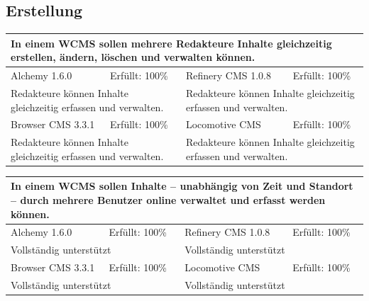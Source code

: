 \subsection{Erstellung}
\begin{tabular}[!ht]{|l|l|l|l|}
\hline
\multicolumn{4}{|p{15cm}|}{\textbf{In einem WCMS sollen mehrere Redakteure Inhalte gleichzeitig erstellen, ändern, löschen und verwalten können.}} \\
\hline
  Alchemy 1.6.0 & \cellcolor{green}Erfüllt: 100\% & Refinery CMS 1.0.8 & \cellcolor{green}Erfüllt: 100\% \\
  \hline
  \multicolumn{2}{|p{7.5cm}|}{Redakteure können Inhalte gleichzeitig erfassen und verwalten.}
   & \multicolumn{2}{p{7.5cm}|}{Redakteure können Inhalte gleichzeitig erfassen und verwalten.} \\
  \hline
  Browser CMS 3.3.1 & \cellcolor{green}Erfüllt: 100\% & Locomotive CMS & \cellcolor{green}Erfüllt: 100\% \\
  \hline
  \multicolumn{2}{|p{7.5cm}|}{Redakteure können Inhalte gleichzeitig erfassen und verwalten.} & \multicolumn{2}{p{7.5cm}|}{Redakteure können Inhalte gleichzeitig erfassen und verwalten.} \\
\hline
\end{tabular}
\newline
\newline
\newline
\begin{tabular}[!ht]{|l|l|l|l|}
\hline
\multicolumn{4}{|p{15cm}|}{\textbf{In einem WCMS sollen Inhalte – unabhängig von Zeit und Standort – durch mehrere Benutzer online verwaltet und erfasst werden können.}} \\
\hline
  Alchemy 1.6.0 & \cellcolor{green}Erfüllt: 100\% & Refinery CMS 1.0.8 & \cellcolor{green}Erfüllt: 100\% \\
  \hline
  \multicolumn{2}{|p{7.5cm}|}{Vollständig unterstützt} & \multicolumn{2}{p{7.5cm}|}{Vollständig unterstützt} \\
  \hline
  Browser CMS 3.3.1 & \cellcolor{green}Erfüllt: 100\% & Locomotive CMS & \cellcolor{green}Erfüllt: 100\% \\
  \hline
  \multicolumn{2}{|p{7.5cm}|}{Vollständig unterstützt} & \multicolumn{2}{p{7.5cm}|}{Vollständig unterstützt} \\
\hline
\end{tabular}
\newline
\newline
\newline
